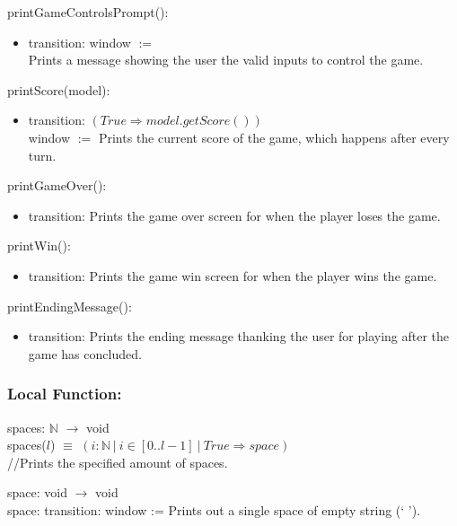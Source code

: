 \documentclass[12pt]{article}
\begin{document}
\bigskip

\noindent printGameControlsPrompt():
\begin{itemize}
\item transition: window $:=$\\ Prints a message showing the user the valid inputs to control the game.
\end{itemize}

\bigskip

\noindent printScore(model):
\begin{itemize}
\item transition: $(True \Rightarrow model.getScore())$\\
window $:=$ Prints the current score of the game, which happens after every turn.
\end{itemize}

\bigskip

\noindent printGameOver():
\begin{itemize}
\item transition: Prints the game over screen for when the player loses the game.
\end{itemize}

\bigskip

\noindent printWin():
\begin{itemize}
\item transition: Prints the game win screen for when the player wins the game.
\end{itemize}

\bigskip

\noindent printEndingMessage():
\begin{itemize}
\item transition: Prints the ending message thanking the user for playing after the game has concluded.
\end{itemize}

\subsubsection*{Local Function:}

spaces: $\mathbb{N}$ $\rightarrow$ void \\
spaces($l$) $\equiv$ $(i:\mathbb{N} \: | \: i \in [0..l-1]  \:| \: True \Rightarrow space)$\\
//Prints the specified amount of spaces.
\medskip

\noindent space: void $\rightarrow$ void\\
space: transition: window := Prints out a single space of empty string (` ').
\newpage
\end{document}
